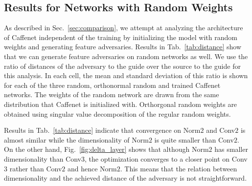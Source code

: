 \documentclass{article} %
\begin{document}
\begin{table}[h!]
\caption{Caffenet layer dimensions.}
\label{tab:caffenet}
\end{table}\subsection{Results for Networks with Random Weights}
As described in Sec.~\ref{sec:comparison}, we attempt at analyzing the
architecture of Caffenet independent of the training by initializing the model
with random weights and generating feature adversaries. Results in
Tab.~\ref{tab:distance} show that we can generate feature adversaries on random
networks as well.  We use the ratio of distances of the adversary to the guide
over the source to the guide for this analysis. In each cell, the mean and
standard deviation of this ratio is shown for each of the three random,
orthonormal random and trained Caffenet networks.  The weights of the random
network are drawn from the same distribution that Caffenet is initialized with.
Orthorgonal random weights are obtained using singular value decomposition of the regular random weights.

Results in Tab.~\ref{tab:distance} indicate that convergence on Norm$2$ and
Conv$2$ is almost similar while the dimensionality of Norm$2$ is quite smaller
than Conv$2$. On the other hand, Fig.~\ref{fig:delta_layer} shows that although
Norm$2$ has smaller dimensionality than Conv$3$,  the optimization converges to
a closer point on Conv$3$ rather than Conv$2$ and hence Norm$2$.  This means
that the relation between dimensionality and the achieved distance of the
adversary is not straightforward.
\end{document}
